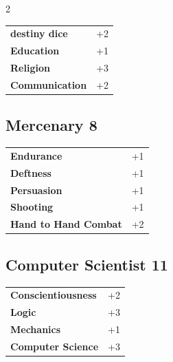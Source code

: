 \begin{multicols}{2}
\begin{tcolorbox}
\vspace{3mm}

\begin{tabular}{@{}ll@{}}
    \textbf{destiny dice} & +2\\
    \textbf{Education} & +1\\
    \textbf{Religion} & +3\\
    \textbf{Communication} & +2\\
\end{tabular}


\end{tcolorbox}

\begin{tcolorbox}
    \subsection*{Mercenary \hfill \small{8 }}
    \tcblower




\begin{tabular}{@{}ll@{}}
    \textbf{Endurance} & +1\\
    \textbf{Deftness} & +1\\
    \textbf{Persuasion} & +1\\
    \textbf{Shooting} & +1\\
    \textbf{Hand to Hand Combat} & +2\\
\end{tabular}


\end{tcolorbox}

\begin{tcolorbox}
    \subsection*{Computer Scientist \hfill \small{11 }}
    \tcblower




\begin{tabular}{@{}ll@{}}
    \textbf{Conscientiousness} & +2\\
    \textbf{Logic} & +3\\
    \textbf{Mechanics} & +1\\
    \textbf{Computer Science} & +3\\
\end{tabular}


\end{tcolorbox}
\end{multicols}
